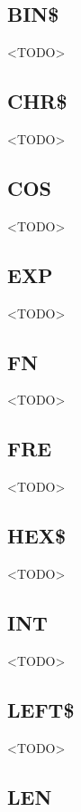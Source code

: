 \subsection{BIN\$}

<TODO>

\subsection{CHR\$}

<TODO>

\subsection{COS}

<TODO>

\subsection{EXP}

<TODO>

\subsection{FN}

<TODO>

\subsection{FRE}

<TODO>

\subsection{HEX\$}

<TODO>

\subsection{INT}

<TODO>

\subsection{LEFT\$}

<TODO>

\subsection{LEN}

